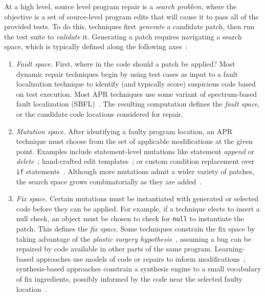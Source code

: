 \documentclass[10pt, conference]{IEEEtran}
\begin{document}
At a high level, source level program repair is a \emph{search problem}, where
the objective is a set of source-level program edits that will cause it to pass
all of the provided tests. To do this, techniques first \emph{generate} a candidate
patch, then run the test suite to \emph{validate} it. Generating a patch
requires navigating a search space, which is typically defined along the
following axes~\cite{ae,sqjo}:
\begin{enumerate}[wide]

\item \emph{Fault space.} First, where 
  in the code should a patch be applied? Most dynamic repair
  techniques begin by using test cases as input to a fault localization
  technique to identify (and typically score) suspicious code
  based on test execution. Most APR techniques
  use some variant of spectrum-based fault localization (SBFL)~\cite{ochiai}. 
  The resulting computation defines the \emph{fault space}, or the
  candidate code locations considered for repair.

\item \emph{Mutation space.} After identifying a faulty program location, an APR
  technique must choose from the set of applicable modifications at the given
  point. Examples include statement-level mutations like statement \emph{append}
  or \emph{delete}~\cite{genprog-operators}; hand-crafted edit
  templates~\cite{par}; or custom condition
  replacement over \texttt{if} statements~\cite{Xuan17}. Although more mutations
  admit a wider variety of patches, the search space grows combinatorially as
  they are added~\cite{long-search-spaces}.

\item \emph{Fix space.} Certain mutations must be instantiated with generated or
  selected code before they can be applied. For example, if a technique elects
  to insert a null check, an object must be chosen to check for 
  \texttt{null} to instantiate the patch. This defines
  the \emph{fix space}. Some techniques
  constrain the fix space by taking advantage of the \emph{plastic surgery
    hypothesis}~\cite{plastic}, assuming a bug can be repaired by code
  available in other parts of the same program. Learning-based
  approaches use models of code or repairs to inform
  modifications~\cite{prophet}; synthesis-based approaches constrain a
  synthesis engine to a small vocabulary of fix ingredients, possibly informed
  by the code near the selected faulty location~\cite{angelix,s3}.


\end{enumerate}
\end{document}
